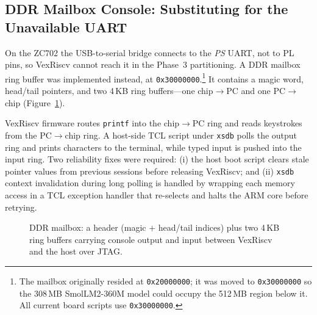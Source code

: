 \subsection{DDR Mailbox Console: Substituting for the Unavailable UART}

On the ZC702 the USB-to-serial bridge connects to the \emph{PS} UART, not to PL pins, so VexRiscv
cannot reach it in the Phase~3 partitioning. A DDR mailbox ring buffer was implemented instead, at
\texttt{0x30000000}.\footnote{The mailbox originally resided at \texttt{0x20000000}; it was moved to
\texttt{0x30000000} so the 308\,MB SmolLM2-360M model could occupy the 512\,MB region below it. All
current board scripts use \texttt{0x30000000}.} It contains a magic word, head/tail pointers, and two
4\,KB ring buffers---one chip$\rightarrow$PC and one PC$\rightarrow$chip (Figure~\ref{fig:p3-mbx}).

VexRiscv firmware routes \texttt{printf} into the chip$\rightarrow$PC ring and reads keystrokes from
the PC$\rightarrow$chip ring. A host-side TCL script under \texttt{xsdb} polls the output ring and
prints characters to the terminal, while typed input is pushed into the input ring. Two reliability
fixes were required: (i) the host boot script clears stale pointer values from previous sessions
before releasing VexRiscv; and (ii) \texttt{xsdb} context invalidation during long polling is handled
by wrapping each memory access in a TCL exception handler that re-selects and halts the ARM core
before retrying.

\begin{figure}[H]
\centering
{}
\caption{DDR mailbox: a header (magic + head/tail indices) plus two 4\,KB ring buffers carrying
console output and input between VexRiscv and the host over JTAG.}
\label{fig:p3-mbx}
\end{figure}

